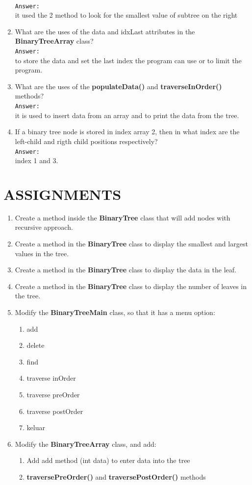 \documentclass[12pt,titlepage]{article}
\begin{document}
\begin{enumerate}
    \mbox{}\\ \texttt{Answer:} \mbox{}\\
    it used the 2 method to look for the smallest value of subtree on the right
    \item What are the uses of the data and idxLast attributes in the \textbf{BinaryTreeArray} class?
    \mbox{}\\ \texttt{Answer:} \mbox{}\\
    to store the data and set the last index the program can use or to limit the program.
    \item What are the uses of the \textbf{populateData()} and \textbf{traverseInOrder()} methods?
    \mbox{}\\ \texttt{Answer:} \mbox{}\\
    it is used to insert data from an array and to print the data from the tree.
    \item If a binary tree node is stored in index array 2, then in what index are the left-child and rigth child positions respectively?
    \mbox{}\\ \texttt{Answer:} \mbox{}\\
    index 1 and 3.
\end{enumerate}

\section{ASSIGNMENTS}
\begin{enumerate}
    \item Create a method inside the \textbf{BinaryTree} class that will add nodes with recursive approach.
    \item Create a method in the \textbf{BinaryTree} class to display the smallest and largest values in the tree.
    \item Create a method in the \textbf{BinaryTree} class to display the data in the leaf.
    \item Create a method in the \textbf{BinaryTree} class to display the number of leaves in the tree.
    \item Modify the \textbf{BinaryTreeMain} class, so that it has a menu option:
    \begin{enumerate}[label=\alph*.]
        \item add
        \item delete
        \item find
        \item traverse inOrder
        \item traverse preOrder
        \item traverse postOrder
        \item keluar
    \end{enumerate}
    \item Modify the \textbf{BinaryTreeArray} class, and add:
    \begin{enumerate}[label=\alph*.]
        \item Add add method (int data) to enter data into the tree
        \item \textbf{traversePreOrder()} and \textbf{traversePostOrder()} methods
    \end{enumerate}
\end{enumerate}
\end{document}
